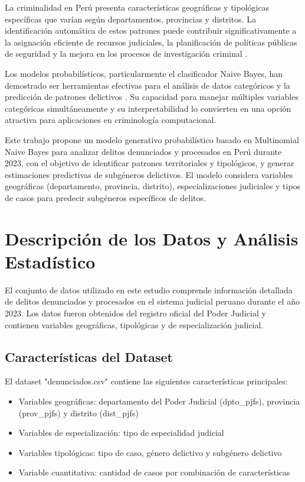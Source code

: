 \documentclass[conference]{IEEEtran}
\begin{document}
La criminalidad en Perú presenta características geográficas y tipológicas específicas que varían según departamentos, provincias y distritos. La identificación automática de estos patrones puede contribuir significativamente a la asignación eficiente de recursos judiciales, la planificación de políticas públicas de seguridad y la mejora en los procesos de investigación criminal \cite{ref2}.

Los modelos probabilísticos, particularmente el clasificador Naive Bayes, han demostrado ser herramientas efectivas para el análisis de datos categóricos y la predicción de patrones delictivos \cite{ref3}. Su capacidad para manejar múltiples variables categóricas simultáneamente y su interpretabilidad lo convierten en una opción atractiva para aplicaciones en criminología computacional.

Este trabajo propone un modelo generativo probabilístico basado en Multinomial Naive Bayes para analizar delitos denunciados y procesados en Perú durante 2023, con el objetivo de identificar patrones territoriales y tipológicos, y generar estimaciones predictivas de subgéneros delictivos. El modelo considera variables geográficas (departamento, provincia, distrito), especializaciones judiciales y tipos de casos para predecir subgéneros específicos de delitos.

\section{Descripción de los Datos y Análisis Estadístico}

El conjunto de datos utilizado en este estudio comprende información detallada de delitos denunciados y procesados en el sistema judicial peruano durante el año 2023. Los datos fueron obtenidos del registro oficial del Poder Judicial y contienen variables geográficas, tipológicas y de especialización judicial.

\subsection{Características del Dataset}

El dataset "denunciados.csv" contiene las siguientes características principales:
\begin{itemize}
\item Variables geográficas: departamento del Poder Judicial (dpto\_pjfs), provincia (prov\_pjfs) y distrito (dist\_pjfs)
\item Variables de especialización: tipo de especialidad judicial
\item Variables tipológicas: tipo de caso, género delictivo y subgénero delictivo
\item Variable cuantitativa: cantidad de casos por combinación de características
\end{itemize}
\end{document}
